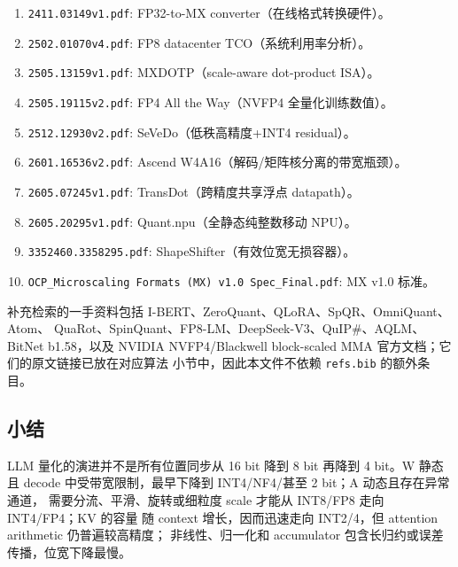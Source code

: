 \begin{enumerate}[label=\textbf{L\arabic*.},leftmargin=3.4em]
  \item \texttt{2411.03149v1.pdf}: FP32-to-MX converter（在线格式转换硬件）。
  \item \texttt{2502.01070v4.pdf}: FP8 datacenter TCO（系统利用率分析）。
  \item \texttt{2505.13159v1.pdf}: MXDOTP（scale-aware dot-product ISA）。
  \item \texttt{2505.19115v2.pdf}: FP4 All the Way（NVFP4 全量化训练数值）。
  \item \texttt{2512.12930v2.pdf}: SeVeDo（低秩高精度+INT4 residual）。
  \item \texttt{2601.16536v2.pdf}: Ascend W4A16（解码/矩阵核分离的带宽瓶颈）。
  \item \texttt{2605.07245v1.pdf}: TransDot（跨精度共享浮点 datapath）。
  \item \texttt{2605.20295v1.pdf}: Quant.npu（全静态纯整数移动 NPU）。
  \item \texttt{3352460.3358295.pdf}: ShapeShifter（有效位宽无损容器）。
  \item \texttt{OCP\_Microscaling Formats (MX) v1.0 Spec\_Final.pdf}: MX v1.0 标准。
\end{enumerate}

补充检索的一手资料包括 I-BERT、ZeroQuant、QLoRA、SpQR、OmniQuant、Atom、
QuaRot、SpinQuant、FP8-LM、DeepSeek-V3、QuIP\#、AQLM、BitNet b1.58，以及
NVIDIA NVFP4/Blackwell block-scaled MMA 官方文档；它们的原文链接已放在对应算法
小节中，因此本文件不依赖 \texttt{refs.bib} 的额外条目。

\subsection{小结}

LLM 量化的演进并不是所有位置同步从 16 bit 降到 8 bit 再降到 4 bit。W 静态且
decode 中受带宽限制，最早下降到 INT4/NF4/甚至 2 bit；A 动态且存在异常通道，
需要分流、平滑、旋转或细粒度 scale 才能从 INT8/FP8 走向 INT4/FP4；KV 的容量
随 context 增长，因而迅速走向 INT2/4，但 attention arithmetic 仍普遍较高精度；
非线性、归一化和 accumulator 包含长归约或误差传播，位宽下降最慢。
